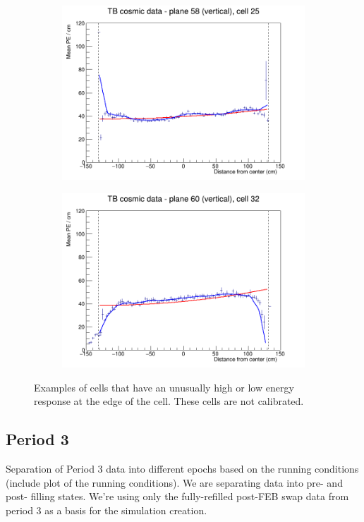 \documentclass[12pt,a4paper]{article}
\begin{document}
\begin{figure}[h]
\begin{subfigure}{0.5\textwidth}
  \end{subfigure}
  \begin{subfigure}{0.5\textwidth}
    \includegraphics[width=\linewidth]{RelativeCalibrationResults/p2_058_025.png}
  \end{subfigure}
  \begin{subfigure}{0.5\textwidth}
    \includegraphics[width=\linewidth]{RelativeCalibrationResults/p2_060_032.png}
  \end{subfigure}
  \caption{Examples of cells that have an unusually high or low energy response at the edge of the cell. These cells are not calibrated.}
  \label{figAttenfitResultsPerio2_CellEdge}
\end{figure}

\subsection{Period 3}
Separation of Period 3 data into different epochs based on the running conditions (include plot of the running conditions). We are separating data into pre- and post- filling states. We're using only the fully-refilled post-FEB swap data from period 3 as a basis for the simulation creation.
\end{document}
